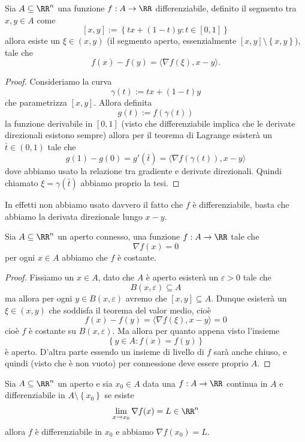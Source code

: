 \documentclass[11pt]{scrartcl}
\begin{document}
	\begin{theorem}
		Sia $A\subseteq \RR^n$ una funzione $f:A\to\RR$ differenziabile, definito il segmento tra $x,y\in A$ come
		$$[x,y]:=\left\{tx+(1-t)y:t\in [0,1]\right\}$$
		allora esiste un $\xi\in (x,y)$ (il segmento aperto, essenzialmente $[x,y]\setminus\left\{x,y\right\}$), tale che
		$$f(x)-f(y)=\langle \nabla f (\xi),x-y\rangle.$$
	\end{theorem}
	\begin{proof}
		Consideriamo la curva
		$$\gamma(t):=tx+(1-t)y$$
		che parametrizza $[x,y]$. Allora definita
		$$g(t):=f(\gamma(t))$$
		la funzione derivabile in $[0,1]$ (visto che differenziabile implica che le derivate direzionali esistono sempre) allora per il teorema di Lagrange esisterà un $\bar{t}\in (0,1)$ tale che
		$$g(1)-g(0)=g'(\bar{t})=\langle \nabla f(\gamma(t)),x-y\rangle$$
		dove abbiamo usato la relazione tra gradiente e derivate direzionali. Quindi chiamato $\xi=\gamma(\bar{t})$ abbiamo proprio la tesi.
	\end{proof}
	In effetti non abbiamo usato davvero il fatto che $f$ è differenziabile, basta che abbiamo la derivata direzionale lungo $x-y$.
	\begin{corollary}
		Sia $A\subseteq \RR^n$ un aperto connesso, una funzione $f:A\to\RR$ tale che
		$$\nabla f(x) =0$$
		per ogni $x\in A$ abbiamo che $f$ è costante.
	\end{corollary}
	\begin{proof}
		Fissiamo un $x\in A$, dato che $A$ è aperto esisterà un $\varepsilon>0$ tale che 
		$$B(x,\varepsilon)\subseteq A$$
		ma allora per ogni $y\in B(x,\varepsilon)$ avremo che $[x,y]\subseteq A$. Dunque esisterà un $\xi\in (x,y)$ che soddisfa il teorema del valor medio, cioè
		$$f(x)-f(y)=\langle \nabla f (\xi),x-y\rangle =0$$
		cioè $f$ è costante su $B(x,\varepsilon)$. Ma allora per quanto appena visto l'insieme
		$$\left\{y\in A:f(x)=f(y)\right\}$$
		è aperto. D'altra parte essendo un insieme di livello di $f$ sarà anche chiuso, e quindi (visto che è non vuoto) per connessione deve essere proprio $A$.
	\end{proof}
	\begin{corollary}
		Sia $A\subseteq \RR^n$ un aperto e sia $x_0\in A$ data una $f:A\to\RR$ continua in $A$ e differenziabile in $A\setminus\left\{x_0\right\}$ se esiste
		$$\lim_{x\to x_0} \nabla f(x)=L\in\RR^n$$
		allora $f$ è differenziabile in $x_0$ e abbiamo $\nabla f(x_0)=L$.
	\end{corollary}
\end{document}
